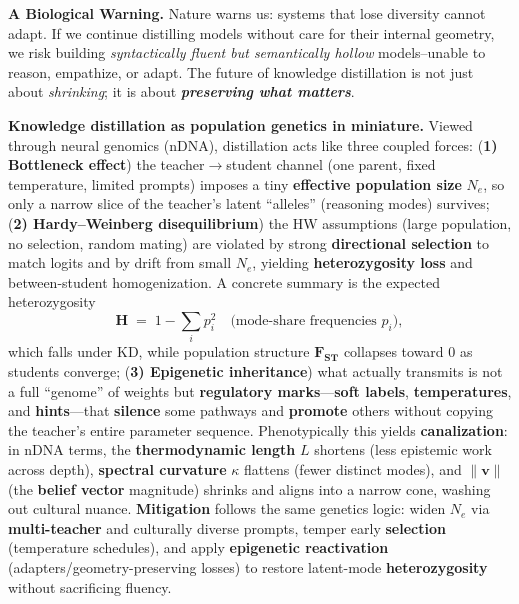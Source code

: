 \vspace{0.5em}
\noindent \textbf{A Biological Warning.} Nature warns us: systems that lose diversity cannot adapt. If we continue distilling models without care for their internal geometry, we risk building \emph{syntactically fluent but semantically hollow} models--unable to reason, empathize, or adapt. The future of knowledge distillation is not just about \emph{shrinking}; it is about \textbf{\emph{preserving what matters}}.


\noindent
\textbf{Knowledge distillation as population genetics in miniature.}
Viewed through neural genomics (nDNA), distillation acts like three coupled forces:
(\textbf{1) Bottleneck effect}) the teacher$\to$student channel (one parent, fixed temperature, limited prompts) imposes a tiny \textbf{effective population size} \(N_e\), so only a narrow slice of the teacher’s latent “alleles” (reasoning modes) survives; 
(\textbf{2) Hardy--Weinberg disequilibrium}) the HW assumptions (large population, no selection, random mating) are violated by strong \textbf{directional selection} to match logits and by drift from small \(N_e\), yielding \textbf{heterozygosity loss} and between-student homogenization. A concrete summary is the expected heterozygosity
\[
\textbf{H} \;=\; 1 - \sum_i p_i^2 \quad\text{(mode-share frequencies \(p_i\))},
\]
which falls under KD, while population structure \(\textbf{F}_{\textbf{ST}}\) collapses toward 0 as students converge; 
(\textbf{3) Epigenetic inheritance}) what actually transmits is not a full “genome” of weights but \textbf{regulatory marks}—\textbf{soft labels}, \textbf{temperatures}, and \textbf{hints}—that \textbf{silence} some pathways and \textbf{promote} others without copying the teacher’s entire parameter sequence. 
Phenotypically this yields \textbf{canalization}: in nDNA terms, the \textbf{thermodynamic length} \(L\) shortens (less epistemic work across depth), \textbf{spectral curvature} \(\kappa\) flattens (fewer distinct modes), and \(\|\textbf{v}\|\) (the \textbf{belief vector} magnitude) shrinks and aligns into a narrow cone, washing out cultural nuance.
\textbf{Mitigation} follows the same genetics logic: widen \(N_e\) via \textbf{multi-teacher} and culturally diverse prompts, temper early \textbf{selection} (temperature schedules), and apply \textbf{epigenetic reactivation} (adapters/geometry-preserving losses) to restore latent-mode \textbf{heterozygosity} without sacrificing fluency.